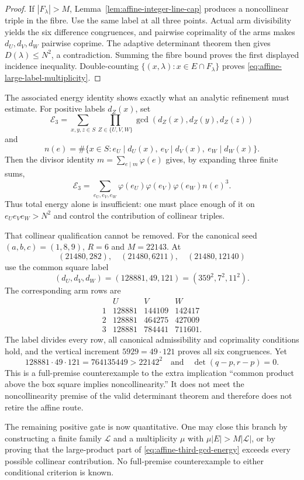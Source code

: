 \begin{proof}
If $|F_\lambda|>M$, Lemma~\ref{lem:affine-integer-line-cap} produces a
noncollinear triple in the fibre.  Use the same label at all three points.
Actual arm divisibility yields the six difference congruences, and
pairwise coprimality of the arms makes $d_U,d_V,d_W$ pairwise coprime.  The
adaptive determinant theorem then gives $D(\lambda)\le N^2$, a contradiction.
Summing the fibre bound proves the first displayed incidence inequality.
Double-counting
$\{(x,\lambda):x\in E\cap F_\lambda\}$ proves
\eqref{eq:affine-large-label-multiplicity}.
\end{proof}

The associated energy identity shows exactly what an analytic refinement
must estimate.  For positive labels $d_Z(x)$, set
\[
 \mathcal E_3=\sum_{x,y,z\in S}
   \prod_{Z\in\{U,V,W\}}\gcd(d_Z(x),d_Z(y),d_Z(z))
\]
and
\[
 n(e)=\#\{x\in S:e_U\mid d_U(x),\ e_V\mid d_V(x),\ e_W\mid d_W(x)\}.
\]
Then the divisor identity $m=\sum_{e\mid m}\varphi(e)$ gives, by expanding
three finite sums,
\begin{equation}\label{eq:affine-third-gcd-energy}
 \mathcal E_3=
 \sum_{e_U,e_V,e_W}\varphi(e_U)\varphi(e_V)\varphi(e_W)n(e)^3.
\end{equation}
Thus total energy alone is insufficient: one must place enough of it on
$e_Ue_Ve_W>N^2$ and control the contribution of collinear triples.

That collinear qualification cannot be removed.  For the canonical seed
$(a,b,c)=(1,8,9)$, $R=6$ and $M=22143$.  At
\[
 (21480,282),\quad(21480,6211),\quad(21480,12140)
\]
use the common square label
\[
 (d_U,d_V,d_W)=(128881,49,121)=(359^2,7^2,11^2).
\]
The corresponding arm rows are
\[
\begin{array}{c|ccc}
 &U&V&W\\ \hline
1&128881&144109&142417\\
2&128881&464275&427009\\
3&128881&784441&711601.
\end{array}
\]
The label divides every row, all canonical admissibility and coprimality
conditions hold, and the vertical increment $5929=49\cdot121$ proves all
six congruences.  Yet
\[
 128881\cdot49\cdot121=764135449>22142^2
 \quad\text{and}\quad \det(q-p,r-p)=0.
\]
This is a full-premise counterexample to the extra implication ``common
product above the box square implies noncollinearity.''  It does not meet
the noncollinearity premise of the valid determinant theorem and therefore
does not retire the affine route.

The remaining positive gate is now quantitative.  One may close this branch
by constructing a finite family $\mathcal L$ and a multiplicity $\mu$ with
$\mu|E|>M|\mathcal L|$, or by proving that the large-product part of
\eqref{eq:affine-third-gcd-energy} exceeds every possible collinear
contribution.  No full-premise counterexample to either conditional criterion
is known.
